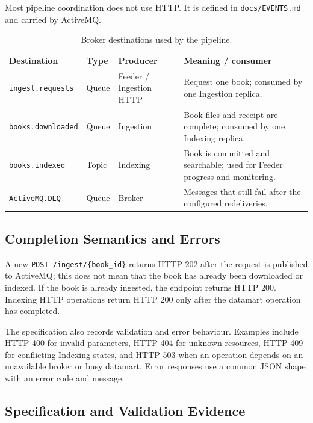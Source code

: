 \documentclass[12pt,a4paper]{article}
\begin{document}
Most pipeline coordination does not use HTTP. It is defined in \texttt{docs/EVENTS.md} and carried
by ActiveMQ.

\begin{table}[H]
    \centering
    \caption{Broker destinations used by the pipeline.}
    \small
    \begin{tabularx}{\textwidth}{p{} p{} p{} X}
        \toprule
        \textbf{Destination} & \textbf{Type} & \textbf{Producer} & \textbf{Meaning / consumer} \\
        \midrule
        \texttt{ingest.requests} & Queue & Feeder / Ingestion HTTP & Request one book; consumed by one Ingestion replica. \\
        \texttt{books.downloaded} & Queue & Ingestion & Book files and receipt are complete; consumed by one Indexing replica. \\
        \texttt{books.indexed} & Topic & Indexing & Book is committed and searchable; used for Feeder progress and monitoring. \\
        \texttt{ActiveMQ.DLQ} & Queue & Broker & Messages that still fail after the configured redeliveries. \\
        \bottomrule
    \end{tabularx}
\end{table}

\subsection{Completion Semantics and Errors}

A new \texttt{POST /ingest/\{book\_id\}} returns HTTP 202 after the request is published to
ActiveMQ; this does not mean that the book has already been downloaded or indexed. If the book is
already ingested, the endpoint returns HTTP 200. Indexing HTTP operations return HTTP 200 only
after the datamart operation has completed.

The specification also records validation and error behaviour. Examples include HTTP 400 for
invalid parameters, HTTP 404 for unknown resources, HTTP 409 for conflicting Indexing states, and
HTTP 503 when an operation depends on an unavailable broker or busy datamart. Error responses use
a common JSON shape with an error code and message.

\subsection{Specification and Validation Evidence}
\end{document}
